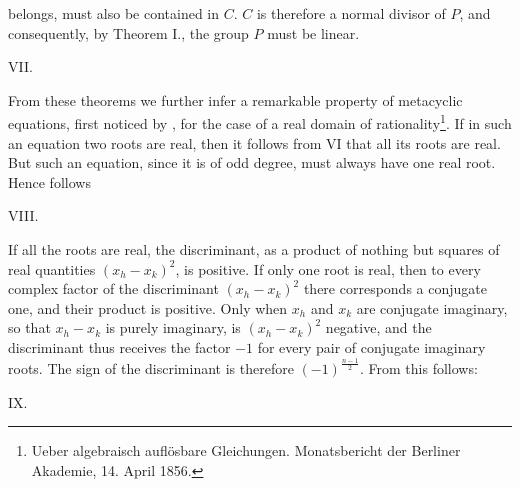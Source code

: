 belongs, must also be contained in $C$. $C$ is therefore a normal
divisor of $P$, and consequently, by Theorem I., the group $P$
must be linear.

VII.~

From these theorems we further infer a remarkable property
of metacyclic equations, first noticed by ,
for the case of a real domain of rationality\footnote{Ueber algebraisch auflösbare Gleichungen. Monatsbericht der Berliner
Akademie, 14. April 1856.}.
If in such an equation two roots are real, then it follows
from VI that all its roots are real. But such an equation,
since it is of odd degree, must always have one real
root. Hence follows

VIII.~

If all the roots are real, the discriminant, as a product
of nothing but squares of real quantities $(x_h - x_k)^2$, is positive. If only
one root is real, then to every complex factor of the
discriminant $(x_h - x_k)^2$ there corresponds a conjugate one, and their product is
positive. Only when $x_h$ and $x_k$ are conjugate imaginary, so that $x_h - x_k$
is purely imaginary, is $(x_h - x_k)^2$ negative, and the discriminant
thus receives the factor $-1$ for every pair of conjugate imaginary
roots. The sign of the discriminant is therefore $(-1)^{\frac{n-1}{2}}$.
From this follows:

IX.~

